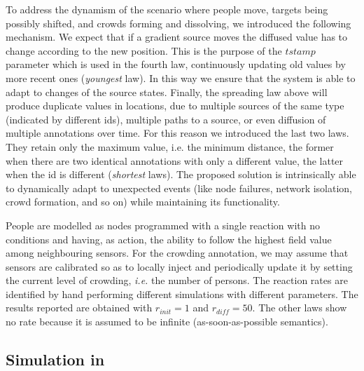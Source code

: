 \documentclass[12pt,a4paper,twoside,openright]{book}
\begin{document}
To address the dynamism of the scenario where people move, targets being possibly shifted, and crowds forming and dissolving, we introduced the following mechanism.
%
We expect that if a gradient source moves the diffused value has to change according to the new position. 
%
This is the purpose of the $tstamp$ parameter which is used in the fourth law, continuously updating old values by more recent ones (\emph{youngest} law).
%
In this way we ensure that the system is able to adapt to changes of the source states. 
%
Finally, the spreading law above will produce duplicate values in locations, due to multiple sources of the same type (indicated by different ids), multiple paths to a source, or even diffusion of multiple annotations over time. For this reason we introduced the last two laws. They retain only the maximum value, i.e. the minimum distance, the former when there are two identical annotations with only a different value, the latter when the id is different (\emph{shortest} laws).
%
The proposed solution is  intrinsically able to dynamically adapt to unexpected events (like node failures, network isolation, crowd formation, and so on) while maintaining its functionality.

People are modelled as nodes programmed with a single reaction with no conditions and having, as action, the ability to follow the highest field value among neighbouring sensors.
%
For the crowding annotation, we may assume that sensors are calibrated so as to locally inject and periodically update it by setting the current level of crowding, \emph{i.e.} the number of persons.
%
The reaction rates are identified by hand performing different simulations with different parameters. The results reported are obtained with $r_{init} = 1$ and $r_{diff} = 50$. The other laws show no rate because it is assumed to be infinite (as-soon-as-possible semantics).

\subsection{Simulation in \alchemist{}}
\end{document}
